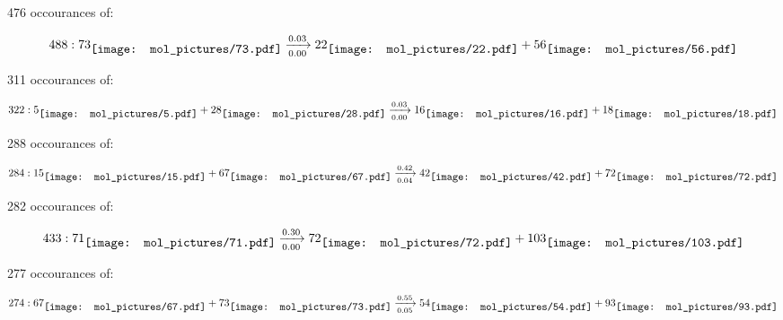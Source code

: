 \documentclass{article}
\begin{document}
\vspace{1cm}


476 occourances of:

$$
488:  
73
\raisebox{-.5\height}{\texttt{[image: mol\_pictures/73.pdf]}}
\xrightarrow[0.00]{0.03}
22
\raisebox{-.5\height}{\texttt{[image: mol\_pictures/22.pdf]}}
+
56
\raisebox{-.5\height}{\texttt{[image: mol\_pictures/56.pdf]}}
$$



\vspace{1cm}


311 occourances of:

$$
322:  
5
\raisebox{-.5\height}{\texttt{[image: mol\_pictures/5.pdf]}}
+
28
\raisebox{-.5\height}{\texttt{[image: mol\_pictures/28.pdf]}}
\xrightarrow[0.00]{0.03}
16
\raisebox{-.5\height}{\texttt{[image: mol\_pictures/16.pdf]}}
+
18
\raisebox{-.5\height}{\texttt{[image: mol\_pictures/18.pdf]}}
$$



\vspace{1cm}


288 occourances of:

$$
284:  
15
\raisebox{-.5\height}{\texttt{[image: mol\_pictures/15.pdf]}}
+
67
\raisebox{-.5\height}{\texttt{[image: mol\_pictures/67.pdf]}}
\xrightarrow[0.04]{0.42}
42
\raisebox{-.5\height}{\texttt{[image: mol\_pictures/42.pdf]}}
+
72
\raisebox{-.5\height}{\texttt{[image: mol\_pictures/72.pdf]}}
$$



\vspace{1cm}


282 occourances of:

$$
433:  
71
\raisebox{-.5\height}{\texttt{[image: mol\_pictures/71.pdf]}}
\xrightarrow[0.00]{0.30}
72
\raisebox{-.5\height}{\texttt{[image: mol\_pictures/72.pdf]}}
+
103
\raisebox{-.5\height}{\texttt{[image: mol\_pictures/103.pdf]}}
$$



\vspace{1cm}


277 occourances of:

$$
274:  
67
\raisebox{-.5\height}{\texttt{[image: mol\_pictures/67.pdf]}}
+
73
\raisebox{-.5\height}{\texttt{[image: mol\_pictures/73.pdf]}}
\xrightarrow[0.05]{0.55}
54
\raisebox{-.5\height}{\texttt{[image: mol\_pictures/54.pdf]}}
+
93
\raisebox{-.5\height}{\texttt{[image: mol\_pictures/93.pdf]}}
$$
\end{document}

